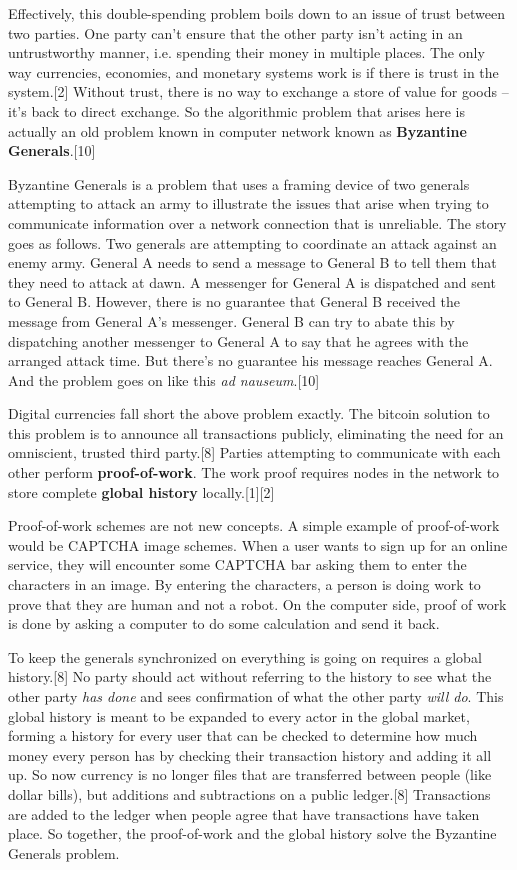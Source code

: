 \documentclass[pdftex,11pt]{article}
\begin{document}
Effectively, this double-spending problem boils down to an issue of trust between two parties. One party can't ensure that the other party isn't acting in an untrustworthy manner, i.e. spending their money in multiple places. The only way currencies, economies, and monetary systems work is if there is trust in the system.[2] Without trust, there is no way to exchange a store of value for goods -- it's back to direct exchange. So the algorithmic problem that arises here is actually an old problem known in computer network known as {\bf Byzantine Generals}.[10] 

Byzantine Generals is a problem that uses a framing device of two generals attempting to attack an army to illustrate the issues that arise when trying to communicate information over a network connection that is unreliable. The story goes as follows. Two generals are attempting to coordinate an attack against an enemy army. General A needs to send a message to General B to tell them that they need to attack at dawn. A messenger for General A is dispatched and sent to General B. However, there is no guarantee that General B received the message from General A's messenger. General B can try to abate this by dispatching another messenger to General A to say that he agrees with the arranged attack time. But there's no guarantee his message reaches General A. And the problem goes on like this {\em ad nauseum}.[10]

Digital currencies fall short the above problem exactly. The bitcoin solution to this problem is to announce all transactions publicly, eliminating the need for an omniscient, trusted third party.[8] Parties attempting to communicate with each other perform {\bf proof-of-work}. The work proof requires nodes in the network to store complete {\bf global history} locally.[1][2] 

Proof-of-work schemes are not new concepts. A simple example of proof-of-work would be CAPTCHA image schemes. When a user wants to sign up for an online service, they will encounter some CAPTCHA bar asking them to enter the characters in an image. By entering the characters, a person is doing work to prove that they are human and not a robot. On the computer side, proof of work is done by asking a computer to do some calculation and send it back. 

To keep the generals synchronized on everything is going on requires a global history.[8] No party should act without referring to the history to see what the other party {\em has done} and sees confirmation of what the other party {\em will do}. This global history is meant to be expanded to every actor in the global market, forming a history for every user that can be checked to determine how much money every person has by checking their transaction history and adding it all up. So now currency is no longer files that are transferred between people (like dollar bills), but additions and subtractions on a public ledger.[8] Transactions are added to the ledger when people agree that have transactions have taken place. So together, the proof-of-work and the global history solve the Byzantine Generals problem.
\end{document}
